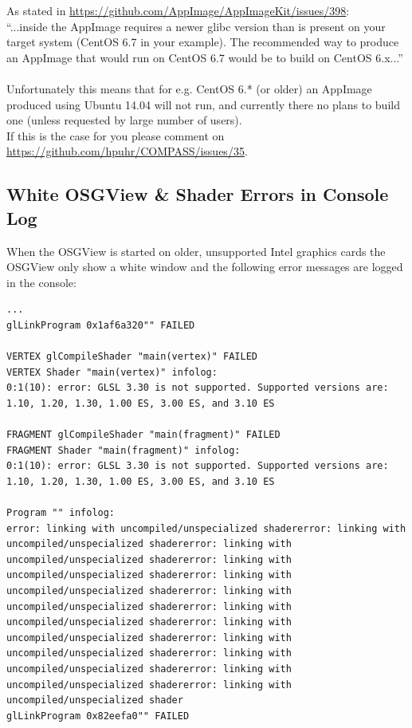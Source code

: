 As stated in \url{https://github.com/AppImage/AppImageKit/issues/398}: \\

``...inside the AppImage requires a newer glibc version than is present on your target system (CentOS 6.7 in your example). The recommended way to produce an AppImage that would run on CentOS 6.7 would be to build on CentOS 6.x...''\\\\

Unfortunately this means that for e.g. CentOS 6.* (or older) an AppImage produced using Ubuntu 14.04 will not run, and currently there no plans to build one (unless requested by large number of users).\\

If this is the case for you please comment on \url{https://github.com/hpuhr/COMPASS/issues/35}.


\subsection{White OSGView \& Shader Errors in Console Log}
\label{ref:issue_shaders}

When the OSGView is started on older, unsupported Intel graphics cards the OSGView only show a white window and the following error messages are logged in the console:

\begin{lstlisting}
...
glLinkProgram 0x1af6a320"" FAILED

VERTEX glCompileShader "main(vertex)" FAILED
VERTEX Shader "main(vertex)" infolog:
0:1(10): error: GLSL 3.30 is not supported. Supported versions are: 1.10, 1.20, 1.30, 1.00 ES, 3.00 ES, and 3.10 ES

FRAGMENT glCompileShader "main(fragment)" FAILED
FRAGMENT Shader "main(fragment)" infolog:
0:1(10): error: GLSL 3.30 is not supported. Supported versions are: 1.10, 1.20, 1.30, 1.00 ES, 3.00 ES, and 3.10 ES

Program "" infolog:
error: linking with uncompiled/unspecialized shadererror: linking with uncompiled/unspecialized shadererror: linking with uncompiled/unspecialized shadererror: linking with uncompiled/unspecialized shadererror: linking with uncompiled/unspecialized shadererror: linking with uncompiled/unspecialized shadererror: linking with uncompiled/unspecialized shadererror: linking with uncompiled/unspecialized shadererror: linking with uncompiled/unspecialized shadererror: linking with uncompiled/unspecialized shadererror: linking with uncompiled/unspecialized shadererror: linking with uncompiled/unspecialized shader
glLinkProgram 0x82eefa0"" FAILED
\end{lstlisting}
\ \\

